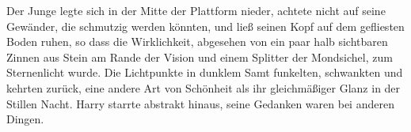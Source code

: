 Der Junge legte sich in der Mitte der Plattform nieder, achtete nicht auf seine Gewänder, die schmutzig werden könnten, und ließ seinen Kopf auf dem gefliesten Boden ruhen, so dass die Wirklichkeit, abgesehen von ein paar halb sichtbaren Zinnen aus Stein am Rande der Vision und einem Splitter der Mondsichel, zum Sternenlicht wurde.
Die Lichtpunkte in dunklem Samt funkelten, schwankten und kehrten zurück, eine andere Art von Schönheit als ihr gleichmäßiger Glanz in der Stillen Nacht.
Harry starrte abstrakt hinaus, seine Gedanken waren bei anderen Dingen.

